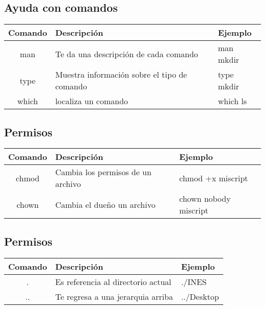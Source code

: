 \documentclass[12pt]{article}
\begin{document}
\subsection{Ayuda con comandos}
\begin{tabular}{|c|l|l|}
\hline
Comando & Descripción & Ejemplo \\ \hline
man & Te da una descripción de cada comando & man mkdir \\ \hline
type & Muestra información sobre el tipo de comando & type mkdir \\ \hline
which & localiza un comando & which ls \\ \hline
\end{tabular}
\subsection{Permisos}
\begin{tabular}{|c|l|l|}
\hline
Comando & Descripción & Ejemplo \\ \hline
chmod & Cambia los permisos de un archivo & chmod +x miscript \\ \hline
chown & Cambia el dueño un archivo & chown nobody miscript\\ \hline
\end{tabular}
\subsection{Permisos}
\begin{tabular}{|c|l|l|}
\hline
Comando & Descripción & Ejemplo \\ \hline
.  & Es referencia al directorio actual & ./INES \\ \hline
.. & Te regresa a una jerarquia arriba & ../Desktop \\ \hline
\end{tabular}
\end{document}
